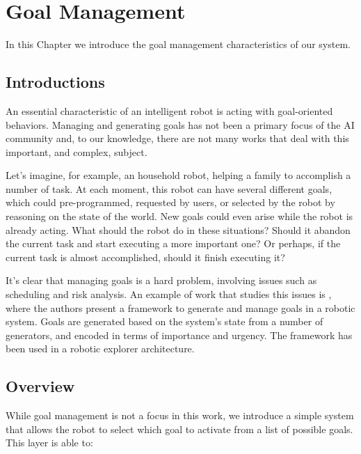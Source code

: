 
\chapter{Goal Management} %

\label{chapter-goal_management} %

In this Chapter we introduce the goal management characteristics of our system.

\section{Introductions}
\label{sec:goal_management-intro}
An essential characteristic of an intelligent robot is acting with goal-oriented behaviors. Managing and generating goals has not been a primary focus of the AI community and, to our knowledge, there are not many works that deal with this important, and complex, subject. 

Let's imagine, for example, an household robot, helping a family to accomplish a number of task. At each moment, this robot can have several different goals, which could pre-programmed, requested by users, or selected by the robot by reasoning on the state of the world. New goals could even arise while the robot is already acting. What should the robot do in these situations? Should it abandon the current task and start executing a more important one? Or perhaps, if the current task is almost accomplished, should it finish executing it?  

It's clear that managing goals is a hard problem, involving issues such as scheduling and risk analysis. An example of work that studies this issues is \cite{hanheide2010framework}, where the authors present a framework to generate and manage goals in a robotic system. Goals are generated based on the system's state from a number of generators, and encoded in terms of importance and urgency. The framework has been used in a robotic explorer architecture.

\section{Overview}
While goal management is not a focus in this work, we introduce a simple system that allows the robot to select which goal to activate from a list of possible goals. This layer is able to:

